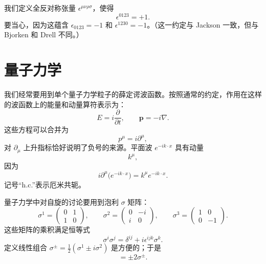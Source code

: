 我们定义全反对称张量 $\epsilon^{\mu\nu\rho\sigma}$，使得
\begin{equation}
  \epsilon^{0123} = +1 .
\end{equation}
要当心，因为这蕴含 $\epsilon_{0123} = -1$ 和 $\epsilon^{1230} = -1$。（这一约定与 Jackson 一致，但与 Bjorken 和 Drell 不同。）

\section*{量子力学}

我们经常要用到单个量子力学粒子的薛定谔波函数。按照通常的约定，作用在这样的波函数上的能量和动量算符表示为：
\begin{equation}
  E = i\frac{\partial}{\partial t},\qquad \mathbf{p} = -i\nabla .
\end{equation}
这些方程可以合并为
\begin{equation}
  p^\mu = i\partial^\mu ,
\end{equation}
对 $\partial_\mu$ 上升指标恰好说明了负号的来源。平面波 $e^{-ik\cdot x}$ 具有动量
\begin{equation}
  k^\mu ,
\end{equation}
因为
\begin{equation}
  i\partial^\mu \bigl( e^{-ik\cdot x} \bigr) = k^\mu e^{-ik\cdot x} .
\end{equation}
记号``h.c.''表示厄米共轭。

量子力学中对自旋的讨论要用到泡利 $\sigma$ 矩阵：
\begin{equation}
  \sigma^1 = \begin{pmatrix}0&1\\1&0\end{pmatrix},\qquad
  \sigma^2 = \begin{pmatrix}0&-i\\i&0\end{pmatrix},\qquad
  \sigma^3 = \begin{pmatrix}1&0\\0&-1\end{pmatrix}.
\end{equation}
这些矩阵的乘积满足恒等式
\begin{equation}
  \sigma^i \sigma^j = \delta^{ij} + i\epsilon^{ijk} \sigma^k .
\end{equation}
定义线性组合 $\sigma^{\pm} = \frac{1}{2}(\sigma^1 \pm i\sigma^2)$ 是方便的；于是
\begin{equation}
  [\sigma^3, \sigma^\pm] = \pm 2 \sigma^\pm .
\end{equation}

